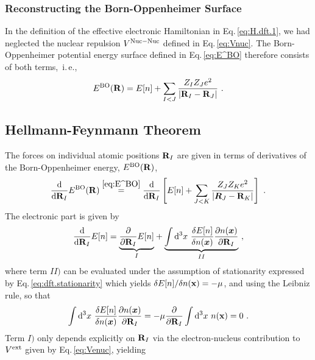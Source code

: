 \documentclass[a4paper,12pt]{book}
\renewcommand{\d}{{\rm d}}
\renewcommand{\b}[1]{\boldsymbol{#1}}
\begin{document}
\subsubsection{Reconstructing the Born-Oppenheimer Surface}
In the definition of the effective electronic Hamiltonian in Eq.\,\eqref{eq:H.dft.1}, we had neglected the nuclear repulsion $V^{\rm Nuc-Nuc}$ defined in Eq.\,\eqref{eq:Vnuc}. The Born-Oppenheimer potential energy surface defined in Eq.\,\eqref{eq:E^BO} therefore consists of both terms,~i.\,e.,
\begin{align}
	E^{\rm BO} ({\bf R}) 
		= E[n] + \sum_{I < J} \frac{Z_{I} Z_{J} e^{2}}{\left|{\bf R}_{I}-{\bf R}_{J}\right|}~.
	\label{eq:E^BO}
\end{align}

\subsection{Hellmann-Feynmann Theorem}
The forces on individual atomic positions ${\bf R}_I$ are given in terms of derivatives of the Born-Oppenheimer energy, $E^{\rm BO} ({\bf R})$,
\begin{align}
	\frac{\d}{\d {\bf R}_I} E^{\rm BO} ({\bf R})
		\stackrel{\eqref{eq:E^BO}}{=}
			\frac{\d}{\d {\bf R}_I } \left[
				E[n] + \sum_{J < K} \frac{Z_{J} Z_{K} e^{2}}{\left|{\b R}_{J}-{\bf R}_{K}\right|}
			\right]
			~.
	\label{eq:hellmannfeynman.1}
\end{align}
The electronic part is given by
\begin{align}
		\frac{\d}{\d {\bf R}_I} E[n]
			= 
				\underset{I}{\underbrace{\frac{\partial}{\partial {\bf R}_I} E[n]}}
			+ \underset{II}{\underbrace{
					\int \d^{3} x ~ \frac{\delta E[n]}{\delta n(\boldsymbol{x})} \frac{\partial n(\boldsymbol{x})}{\partial {\bf R}_{I}}
				}}~,
		\label{eq:hellmannfeynman.2}
\end{align}
where term $II)$ can be evaluated under the assumption of stationarity expressed by Eq.\,\eqref{eq:dft.stationarity} which yields 
\mbox{$\delta E[n] / \delta n({\bf x}) = -\mu$},
and using the Leibniz rule, so that
\begin{align}
	\int \d^{3} x ~ \frac{\delta E[n]}{\delta n(\boldsymbol{x})} \frac{\partial n(\boldsymbol{x})}{\partial {\bf R}_{I}}
	= -\mu \frac{\partial}{\partial {\bf R}_I} \int \d^{3} x ~ n ({\bf x})
	= 0~.
	\label{eq:hellmannfeynman.3}
\end{align}
Term $I)$ only depends explicitly on ${\bf R}_I$ via the electron-nucleus contribution to $V^{\rm ext}$ given by Eq.\,\eqref{eq:Venuc}, yielding
\end{document}
